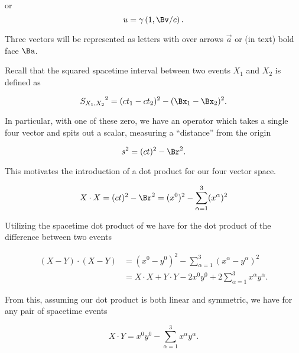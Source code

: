or
\begin{equation}\label{eqn:relativisticElectrodynamicsT1:82}
u = \gamma \left(1, \Bv/c \right).
\end{equation}

Three vectors will be represented as letters with over arrows $\vec{a}$ or (in text) bold face $\Ba$.

Recall that the squared spacetime interval between two events $X_1$ and $X_2$ is defined as

\begin{equation}\label{eqn:relativisticElectrodynamicsT1:60}
{S_{X_1, X_2}}^2 = (ct_1 - c t_2)^2 - (\Bx_1 - \Bx_2)^2.
\end{equation}

In particular, with one of these zero, we have an operator which takes a single four vector and spits out a scalar, measuring a ``distance'' from the origin

\begin{equation}\label{eqn:relativisticElectrodynamicsT1:30}
s^2 = (ct)^2 - \Br^2.
\end{equation}

This motivates the introduction of a dot product for our four vector space.  

\begin{equation}\label{eqn:relativisticElectrodynamicsT1:50}
X \cdot X = (ct)^2 - \Br^2 = (x^0)^2 - \sum_{\alpha=1}^3 (x^\alpha)^2
\end{equation}

Utilizing the spacetime dot product of  we have for the dot product of the difference between two events

\begin{equation}\label{eqn:relativisticElectrodynamicsT1a:140}
\begin{aligned}
(X - Y) \cdot (X - Y)
&=
(x^0 - y^0)^2 - \sum_{\alpha =1}^3 (x^\alpha - y^\alpha)^2 \\
&=
X \cdot X + Y \cdot Y - 2 x^0 y^0 + 2 \sum_{\alpha =1}^3 x^\alpha y^\alpha.
\end{aligned}
\end{equation}

From this, assuming our dot product  is both linear and symmetric, we have for any pair of spacetime events

\begin{equation}\label{eqn:relativisticElectrodynamicsT1:55}
X \cdot Y = x^0 y^0 - \sum_{\alpha =1}^3 x^\alpha y^\alpha.
\end{equation}

